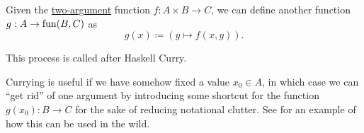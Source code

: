 \begin{definition}\label{def:currying}
  Given the \hyperref[def:multi_valued_function/arity]{two-argument} function \( f: A \times B \to C \), we can define another function \( g: A \to \operatorname{fun}(B, C) \) as
  \begin{equation*}
    g(x) \coloneqq (y \mapsto f(x, y)).
  \end{equation*}

  This process is called  after Haskell Curry.

  Currying is useful if we have somehow fixed a value \( x_0 \in A \), in which case we can \enquote{get rid} of one argument by introducing some shortcut for the function \( g(x_0): B \to C \) for the sake of reducing notational clutter. See  for an example of how this can be used in the wild.
\end{definition}
